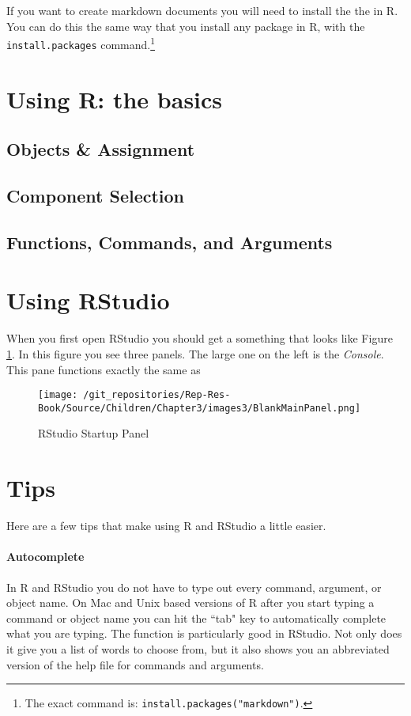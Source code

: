 \documentclass[ChapterTOCs,krantz1]{krantz}
\begin{document}
If you want to create markdown documents you will need to install the the  in R. You can do this the same way that you install any package in R, with the {\tt{install.packages}} command.\footnote{The exact command is: {\tt{install.packages("markdown")}}.} 

\section{Using R: the basics}

\subsection{Objects \& Assignment}

\subsection{Component Selection}

\subsection{Functions, Commands, and Arguments}

\section{Using RStudio}

When you first open RStudio you should get a something that looks like Figure \ref{BlankMain}. In this figure you see three panels. The large one on the left is the {\emph{Console}}. This pane functions exactly the same as 

\begin{figure}[t]
    \caption{RStudio Startup Panel}
    \label{BlankMain}

    \texttt{[image: /git\_repositories/Rep-Res-Book/Source/Children/Chapter3/images3/BlankMainPanel.png]}
\end{figure}


\section{Tips}

Here are a few tips that make using R and RStudio a little easier.

\paragraph{Autocomplete}

In R and RStudio you do not have to type out every command, argument, or object name. On Mac and Unix based versions of R after you start typing a command or object name you can hit the ``tab" key to automatically complete what you are typing. The  function is particularly good in RStudio. Not only does it give you a list of words to choose from, but it also shows you an abbreviated version of the help file for commands and arguments.
\end{document}
